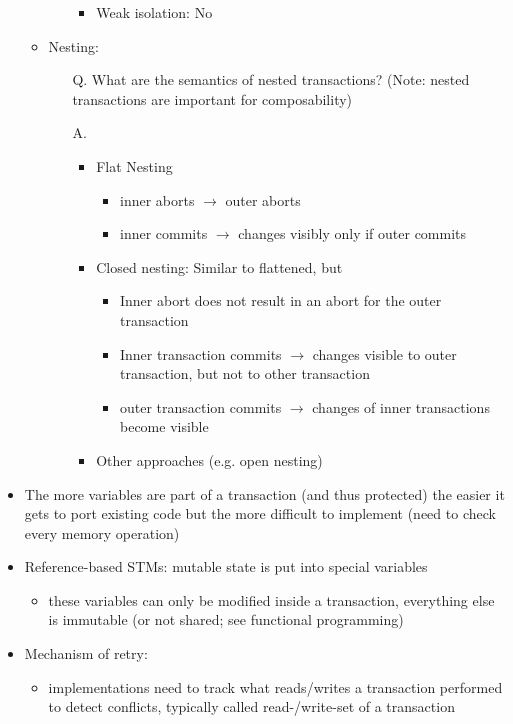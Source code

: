 \documentclass[a4paper]{article}
\begin{document}
\begin{itemize}
\begin{itemize}
\begin{enumerate}
\begin{itemize}
\item Weak isolation: No
\end{itemize}
\end{enumerate}
\item Nesting:
\begin{enumerate}
\item[Q.] What are the semantics of nested transactions? (Note: nested transactions are important for composability)
\item[A.]
\begin{itemize}
\item Flat Nesting
\begin{itemize}
\item inner aborts $\rightarrow$ outer aborts
\item inner commits $\rightarrow$ changes visibly only if outer commits
\end{itemize}
\item Closed nesting: Similar to flattened, but
\begin{itemize}
\item Inner abort does not result in an abort for the outer transaction
\item Inner transaction commits $\to$ changes visible to outer transaction, but not to other transaction
\item outer transaction commits $\to$ changes of inner transactions become visible
\end{itemize}
\item Other approaches (e.g. open nesting)
\end{itemize}
\end{enumerate}
\end{itemize}
\item The more variables are part of a transaction (and thus protected) the easier it gets to port existing code but the more difficult to implement (need to check every memory operation)
\item Reference-based STMs: mutable state is put into special variables
\begin{itemize}
\item  these variables can only be modified inside a transaction, everything else is immutable (or not shared; see functional programming)
\end{itemize}
\item Mechanism of retry: 
\begin{itemize}
\item implementations need to track what reads/writes a transaction performed to detect conflicts, typically called read-/write-set of a transaction

\end{itemize}
\end{itemize}
\end{document}
